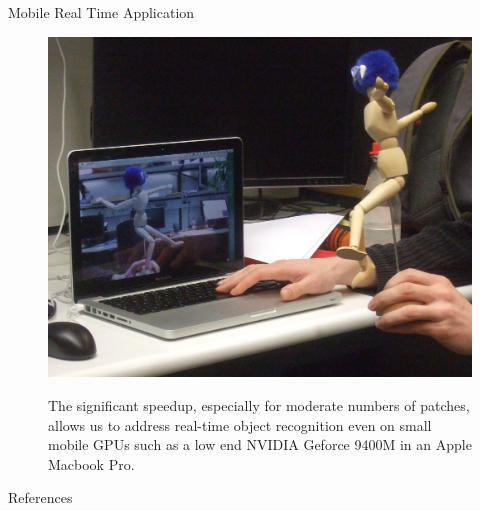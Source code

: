 \documentclass[final]{beamer}
\begin{document}
\begin{frame}{}
\begin{columns}[t]
\begin{column}{.48\linewidth}
        \begin{block}{Mobile Real Time Application}
	
					\begin{figure}[htb]
					  \centering
					    \includegraphics[width=.6666\linewidth]{images/HS_2010-03-15_225559} \\
					  \caption{ The significant speedup, especially for moderate numbers of patches, allows us to address real-time object recognition even on small mobile GPUs such as a low end NVIDIA Geforce 9400M in an Apple Macbook Pro. }
					  \label{fig:performance}
					\end{figure}
        \end{block}
        
        \begin{block}{References}
        \tiny
	
	
	\end{block}
	
	
	
       \end{column}
    \end{columns}
  \end{frame}
\end{document}
